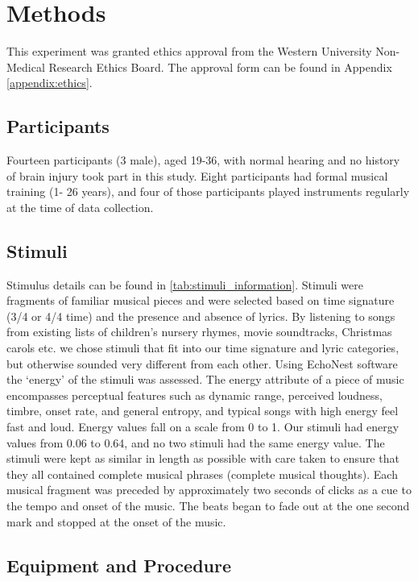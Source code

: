 \chapter{Methods}
This experiment was granted ethics approval from the Western University Non-Medical Research Ethics Board. 
The approval form can be found in Appendix \ref{appendix:ethics}.
\section{Participants}
Fourteen participants (3 male), aged 19-36, with normal hearing and no history of brain injury took part in this study. Eight participants had formal musical training (1- 26 years), and four of those participants played instruments regularly at the time of data collection.
\section{Stimuli}
Stimulus details can be found in \autoref{tab:stimuli_information}.
Stimuli were fragments of familiar musical pieces and were selected based on time signature (3/4 or 4/4 time) and the presence and absence of lyrics. 
By listening to songs from existing lists of children's nursery rhymes, movie soundtracks, Christmas carols etc. we chose stimuli that fit into our time signature and lyric categories, but otherwise sounded very different from each other. 
Using EchoNest software \cite{ellis2010echo} the `energy' of the stimuli was assessed. 
The energy attribute of a piece of music encompasses perceptual features such as dynamic range, perceived loudness, timbre, onset rate, and general entropy, and typical songs with high energy feel fast and loud.
Energy values fall on a scale from 0 to 1.
Our stimuli had energy values from 0.06 to 0.64, and no two stimuli had the same energy value.
The stimuli were kept as similar in length as possible with care taken to ensure that they all contained complete musical phrases (complete musical thoughts).
Each musical fragment was preceded by approximately two seconds of clicks as a cue to the tempo and onset of the music. The beats began to fade out at the one second mark and stopped at the onset of the music. 

\section{Equipment and Procedure}
